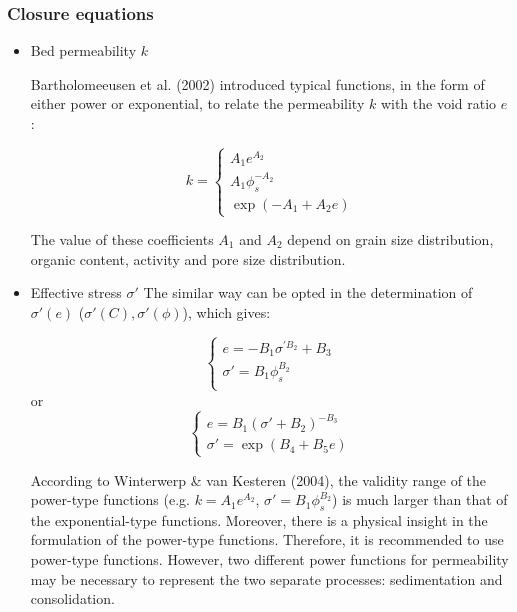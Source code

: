 \subsubsection{Closure equations}
\begin{itemize}
\item Bed permeability $k$

Bartholomeeusen et al. (2002) introduced typical functions, in the form of
either power or exponential, to relate the permeability $k$ with the void
ratio $e$:

\begin{equation*}
k=\left\{\begin{array}{l}
A_1 e^{A_2} \\ 
A_1 \phi_s ^{-A_2 } \\ 
\exp (-A_1 +A_2 e)%
\end{array}
\right. 
\end{equation*}

The value of these coefficients $A_1$ and $A_2$ depend on grain size
distribution, organic content, activity and pore size distribution.

\item Effective stress $\sigma'$
The similar way can be opted in the determination of $\sigma'(e)$
($\sigma'(C),\sigma'(\phi)$), which gives:

\begin{equation*}
\left\{ 
\begin{array}{l}
e=-B_1 \sigma^{' B_2} + B_3 \\ 
\sigma' = B_1 \phi_s^{B_2} \\ 
\end{array}
\right. 
\end{equation*}%
or 
\begin{equation*}
\left\{ 
\begin{array}{l}
e=B_1 (\sigma'+ B_2)^{-B_3} \\ 
\sigma'=\exp (B_4+B_5 e)
\end{array}
\right. 
\end{equation*}%

According to Winterwerp \& van Kesteren (2004), the validity range of the
power-type functions (e.g. $k=A_1 e^{A_2}$, $\sigma' = B_1 \phi_s^{B_2}$) 
is much larger than that of the exponential-type functions. Moreover,
there is a physical insight in the formulation of the power-type functions.
Therefore, it is recommended to use power-type functions. However, two
different power functions for permeability may be necessary to represent the
two separate processes: sedimentation and consolidation.

\end{itemize}



